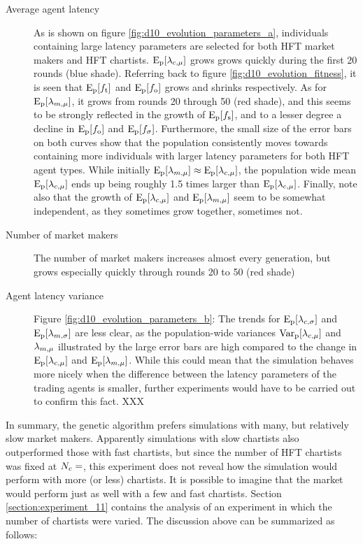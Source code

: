 \begin{description}
\item[Average agent latency]  As is shown on figure \ref{fig:d10_evolution_parameters_a}, individuals containing large latency parameters are selected for both HFT market makers and HFT chartists. $\mathrm{E}_\text{p}[\lambda_{c, \mu}]$ grows grows quickly during the first 20 rounds (blue shade). Referring back to figure \ref{fig:d10_evolution_fitness}, it is seen that $\mathrm{E}_\text{p}[f_\text{t}]$ and $\mathrm{E}_\text{p}[f_\text{o}]$ grows and shrinks respectively. As for $\mathrm{E}_\text{p}[\lambda_{m, \mu}]$, it grows from rounds 20 through 50 (red shade), and this  seems to be strongly reflected in the growth of $\mathrm{E}_\text{p}[f_\text{s}]$, and to a lesser degree a decline in $\mathrm{E}_\text{p}[f_\text{o}]$ and $\mathrm{E}_\text{p}[f_\sigma]$. Furthermore, the small size of the error bars on both curves show that the population consistently moves towards containing more individuals with larger latency parameters for both HFT agent types. While initially $\mathrm{E}_\text{p}[\lambda_{m, \mu}] \approx \mathrm{E}_\text{p}[\lambda_{c, \mu}]$, the population wide mean $\mathrm{E}_\text{p}[\lambda_{c, \mu}]$ ends up being roughly 1.5 times larger than $\mathrm{E}_\text{p}[\lambda_{c, \mu}]$. Finally, note also that the growth of  $\mathrm{E}_\text{p}[\lambda_{c, \mu}]$ and $\mathrm{E}_\text{p}[\lambda_{m, \mu}]$ seem to be somewhat independent, as they sometimes grow together, sometimes not.

\item[Number of market makers] The number of market makers increases almost every generation, but grows especially quickly through rounds 20 to 50 (red shade)

\item[Agent latency variance] Figure \ref{fig:d10_evolution_parameters_b}: The trends for $\mathrm{E}_\text{p}[\lambda_{c, \sigma}]$ and $\mathrm{E}_\text{p}[\lambda_{m, \sigma}]$ are less clear, as the population-wide variances $\mathrm{Var}_\text{p}[\lambda_{c, \mu}]$ and $\lambda_{m, \mu}$ illustrated by the large error bars are high compared to the change in $\mathrm{E}_\text{p}[\lambda_{c, \mu}]$ and $\mathrm{E}_\text{p}[\lambda_{m, \mu}]$. While this could mean that the simulation behaves more nicely when the difference between the latency parameters of the trading agents is smaller, further experiments would have to be carried out to confirm this fact. XXX
\end{description}

In summary, the genetic algorithm prefers simulations with many, but relatively slow market makers. Apparently simulations with slow chartists also outperformed those with fast chartists, but since the number of HFT chartists was fixed at $N_{c} = $, this experiment does not reveal how the simulation would perform with more (or less) chartists. It is possible to imagine that the market would perform just as well with a few and fast chartists. Section \ref{section:experiment_11} contains the analysis of an experiment in which the number of chartists were varied. The discussion above can be summarized as follows:

